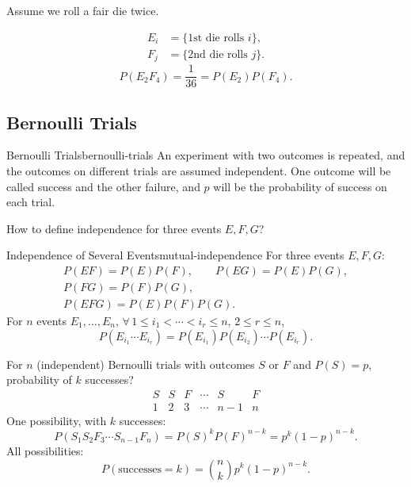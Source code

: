 \begin{example}
  Assume we roll a fair die twice.
  \begin{center}
  \end{center}
  \begin{align*}
    E_i & =\{\text{1st die rolls }i\}, \\
    F_j & =\{\text{2nd die rolls }j\}.
  \end{align*}
  \[
    P(E_2F_4)=\frac1{36}=P(E_2)P(F_4).
  \]
\end{example}

\subsection{Bernoulli Trials}

\begin{definition}{Bernoulli Trials}{bernoulli-trials}
  An experiment with two outcomes is repeated, and the outcomes on different trials are assumed independent.
  One outcome will be called success and the other failure, and $p$ will be the probability of success on each trial.
\end{definition}

How to define independence for three events $E,F,G$?
\begin{definition}{Independence of Several Events}{mutual-independence}
  For three events $E,F,G$:
  \begin{gather*}
    P(EF)=P(E)P(F),\qquad P(EG)=P(E)P(G),\\
    P(FG)=P(F)P(G),\\
    P(EFG)=P(E)P(F)P(G).
  \end{gather*}
  For $n$ events $E_1,\ldots,E_n$, $\forall\,1\le i_1<\cdots<i_r\le n$,
  $2\le r\le n$,
  \[
    P(E_{i_1}\cdots E_{i_r})=P(E_{i_1})P(E_{i_2})\cdots P(E_{i_r}).
  \]
\end{definition}

For $n$ (independent) Bernoulli trials with outcomes $S$ or $F$ and $P(S)=p$, probability of $k$ successes?
\[
  \begin{array}{cccccc}
    S & S & F & \cdots & S   & F \\ \hline
    1 & 2 & 3 & \cdots & n-1 & n
  \end{array}
\]
One possibility, with $k$ successes:
\[
  P(S_1S_2F_3\cdots S_{n-1}F_n)=P(S)^kP(F)^{n-k}=p^k(1-p)^{n-k}.
\]
All possibilities:
\[
  P(\text{successes}=k)=\binom nk p^k(1-p)^{n-k}.
\]

